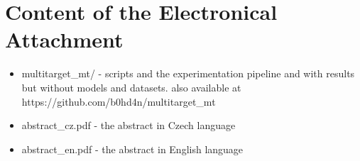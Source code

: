 \section{Content of the Electronical Attachment}

\begin{itemize}
\item {multitarget\_mt/} - scripts and the experimentation pipeline and with results but without models and datasets. also available at https://github.com/b0hd4n/multitarget\_mt

\item {abstract\_cz.pdf} - the abstract in Czech language

\item {abstract\_en.pdf} - the abstract in English language
\end{itemize}

